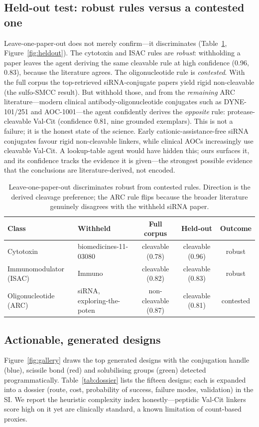 \documentclass[10pt]{article}
\begin{document}
\subsection{Held-out test: robust rules versus a contested one}
Leave-one-paper-out does not merely confirm---it discriminates (Table~\ref{tab:heldout}, Figure~\ref{fig:heldout}). The cytotoxin and ISAC rules are \emph{robust}: withholding a paper leaves the agent deriving the same cleavable rule at high confidence (0.96, 0.83), because the literature agrees. The oligonucleotide rule is \emph{contested}. With the full corpus the top-retrieved siRNA-conjugate papers yield rigid non-cleavable (the sulfo-SMCC result). But withhold those, and from the \emph{remaining} ARC literature---modern clinical antibody-oligonucleotide conjugates such as DYNE-101/251 and AOC-1001---the agent confidently derives the \emph{opposite} rule: protease-cleavable Val-Cit (confidence 0.81, nine grounded exemplars). This is not a failure; it is the honest state of the science. Early cationic-assistance-free siRNA conjugates favour rigid non-cleavable linkers, while clinical AOCs increasingly use cleavable Val-Cit. A lookup-table agent would have hidden this; ours surfaces it, and its confidence tracks the evidence it is given---the strongest possible evidence that the conclusions are literature-derived, not encoded.

\begin{table}[t]\centering\caption{Leave-one-paper-out discriminates robust from contested rules. Direction is the derived cleavage preference; the ARC rule flips because the broader literature genuinely disagrees with the withheld siRNA paper.}\label{tab:heldout}\small
\begin{tabular}{l l c c c}\toprule
Class & Withheld & Full corpus & Held-out & Outcome \\ \midrule
Cytotoxin & biomedicines-11-03080 & cleavable (0.78) & cleavable (0.96) & robust \\
Immunomodulator (ISAC) & Immuno & cleavable (0.82) & cleavable (0.83) & robust \\
Oligonucleotide (ARC) & siRNA, exploring-the-poten & non-cleavable (0.87) & cleavable (0.81) & contested \\
\bottomrule\end{tabular}\end{table}

\subsection{Actionable, generated designs}
Figure~\ref{fig:gallery} draws the top generated designs with the conjugation handle (blue), scissile bond (red) and solubilising groups (green) detected programmatically. Table~\ref{tab:dossier} lists the fifteen designs; each is expanded into a dossier (route, cost, probability of success, failure modes, validation) in the SI. We report the heuristic complexity index honestly---peptidic Val-Cit linkers score high on it yet are clinically standard, a known limitation of count-based proxies.
\end{document}
